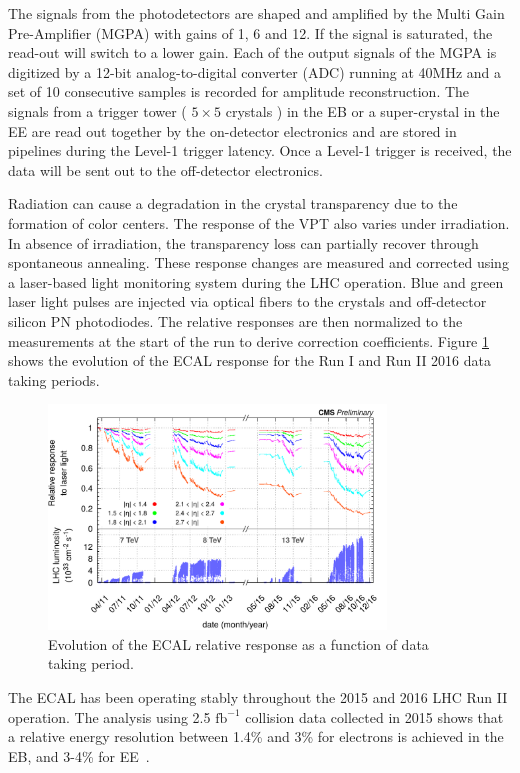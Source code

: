 \documentclass[thesis.tex]{subfiles}
\begin{document}
The signals from the photodetectors are shaped and amplified by the Multi Gain Pre-Amplifier (MGPA) with gains of 1, 6 and 12. 
If the signal is saturated, the read-out will switch to a lower gain. 
Each of the output signals of the MGPA is digitized by a 12-bit analog-to-digital converter (ADC) running at 40MHz and a set of 10 consecutive samples is recorded for amplitude reconstruction.
The signals from a trigger tower ( $5\times5$ crystals ) in the EB or a super-crystal in the EE are read out together by the on-detector electronics and are stored in pipelines during the Level-1 trigger latency. 
Once a Level-1 trigger is received, the data will be sent out to the off-detector electronics. 

Radiation can cause a degradation in the crystal transparency due to the formation of color centers. 
The response of the VPT also varies under irradiation. 
In absence of irradiation, the transparency loss can partially recover through spontaneous annealing. 
These response changes are measured and corrected using a laser-based light monitoring system during the LHC operation. 
Blue and green laser light pulses are injected via optical fibers to the crystals and off-detector silicon PN photodiodes. 
The relative responses are then normalized to the measurements at the start of the run to derive correction coefficients. 
Figure \ref{fig:lasermonitor} shows the evolution of the ECAL response for the Run I and Run II 2016 data taking periods. 

\begin{figure}[hbt]
	\centering
	\includegraphics[width=0.8\textwidth]{Fig/lasermonitor.png}
	\caption{Evolution of the ECAL relative response as a function of data taking period.} 
	\label{fig:lasermonitor}
\end{figure}

The ECAL has been operating stably throughout the 2015 and 2016 LHC Run II operation.
The analysis using 2.5 $\text{fb}^{-1}$ collision data collected in 2015 shows that a relative energy resolution
between 1.4\% and 3\% for electrons is achieved in the EB, and 3-4\% for EE~\cite{Sun:2233637}. 
\end{document}
